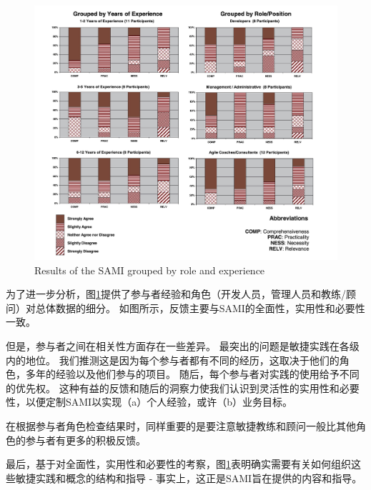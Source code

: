\documentclass[twocolumn]{svjour3}[]
\begin{document}
\begin{figure} [htb]
    \centering
    \includegraphics[width=1.0\textwidth]{img/fig5.jpg}
    \caption{Results of the SAMI grouped by role and experience}
    \label{fig.5}
\end{figure}

为了进一步分析，图\ref{fig.5}提供了参与者经验和角色（开发人员，管理人员和教练/顾问）对总体数据的细分。 如图所示，反馈主要与SAMI的全面性，实用性和必要性一致。

但是，参与者之间在相关性方面存在一些差异。 最突出的问题是敏捷实践在各级内的地位。 我们推测这是因为每个参与者都有不同的经历，这取决于他们的角色，多年的经验以及他们参与的项目。 随后，每个参与者对实践的使用给予不同的优先权。 这种有益的反馈和随后的洞察力使我们认识到灵活性的实用性和必要性，以便定制SAMI以实现（a）个人经验，或许（b）业务目标。

在根据参与者角色检查结果时，同样重要的是要注意敏捷教练和顾问一般比其他角色的参与者有更多的积极反馈。

最后，基于对全面性，实用性和必要性的考察，图\ref{fig.5}表明确实需要有关如何组织这些敏捷实践和概念的结构和指导 - 事实上，这正是SAMI旨在提供的内容和指导。
\end{document}
